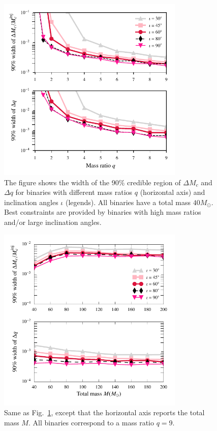 \documentclass[prl,preprintnumbers,twocolumn,eqsecnum,floatfix,a4paper,nofootinbib,superscriptaddress]{revtex4}
\begin{document}
\begin{figure}[tbh]
	\includegraphics*[width=3.5in]{figs/fig3a_9dim_dmcbymcinj_dq_abhi.pdf}
	\caption{The figure shows the width of the 90$\%$ credible region of $\Delta M_c$ and $\Delta q$ for binaries with different mass ratios $q$ (horizontal axis) and inclination angles $\iota$ (legends). All binaries have a total mass $40M_{\odot}$. Best constraints are provided by binaries with high mass ratios and/or large inclination angles.}
	\label{fig:dMc_dq_posteriors_gr_vs_q}
\end{figure}

\begin{figure}[tbh]
	\includegraphics*[width=3.5in]{figs/fig3b_9dim_dmcbymcinj_dq_abhi.pdf}
	\caption{Same as Fig.~\ref{fig:dMc_dq_posteriors_gr_vs_q}, except that the horizontal axis reports the total mass $M$. All binaries correspond to a mass ratio $q = 9$.}
	\label{fig:dMc_dq_posteriors_gr_vs_M}
\end{figure}
\end{document}
